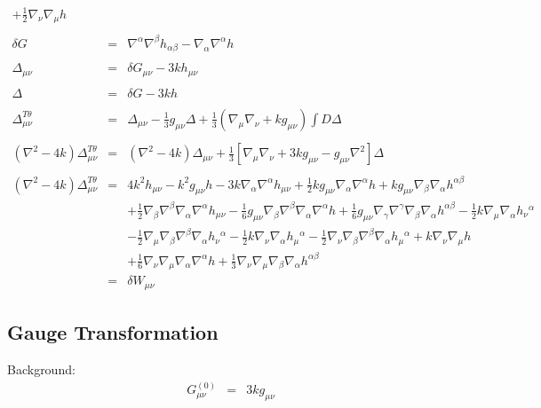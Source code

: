 \documentclass[10pt,letterpaper]{article}
\numberwithin{equation}{section}
\begin{document}
\begin{eqnarray}
+ \tfrac{1}{2} \nabla_{\nu}\nabla_{\mu}h
\nonumber\\ \nonumber\\
\delta G &=&  \nabla^\alpha \nabla^\beta h_{\alpha\beta} - \nabla_\alpha\nabla^\alpha h
\nonumber\\\nonumber\\
\Delta_{\mu\nu} &=& \delta G_{\mu\nu}-3k h_{\mu\nu}
\nonumber\\ \nonumber\\
\Delta &=& \delta G-3k h
\nonumber\\\nonumber\\
\Delta^{T\theta}_{\mu\nu} &=&  \Delta_{\mu\nu} - \frac{1}{3}g_{\mu\nu} \Delta + \frac{1}{3}\left( \nabla_\mu\nabla_\nu +kg_{\mu\nu}\right)\int D \Delta
\nonumber\\ \nonumber\\
(\nabla^2 -4k)\Delta^{T\theta}_{\mu\nu} &=& (\nabla^2 -4k)\Delta_{\mu\nu} +
\frac{1}{3}\left[ \nabla_\mu\nabla_\nu + 3k g_{\mu\nu} - g_{\mu\nu}\nabla^2\right] \Delta
\nonumber\\ \nonumber\\
(\nabla^2 -4k)\Delta^{T\theta}_{\mu\nu} &=& 
4 k^2 h_{\mu \nu}
-  k^2 g_{\mu \nu} h
- 3 k \nabla_{\alpha}\nabla^{\alpha}h_{\mu \nu}
+ \tfrac{1}{2} k g_{\mu \nu} \nabla_{\alpha}\nabla^{\alpha}h
+ k g_{\mu \nu} \nabla_{\beta}\nabla_{\alpha}h^{\alpha \beta}\nonumber\\
&& + \tfrac{1}{2} \nabla_{\beta}\nabla^{\beta}\nabla_{\alpha}\nabla^{\alpha}h_{\mu \nu}
-  \tfrac{1}{6} g_{\mu \nu} \nabla_{\beta}\nabla^{\beta}\nabla_{\alpha}\nabla^{\alpha}h
+ \tfrac{1}{6} g_{\mu \nu} \nabla_{\gamma}\nabla^{\gamma}\nabla_{\beta}\nabla_{\alpha}h^{\alpha \beta}
-  \tfrac{1}{2} k \nabla_{\mu}\nabla_{\alpha}h_{\nu}{}^{\alpha}\nonumber\\
&& -  \tfrac{1}{2} \nabla_{\mu}\nabla_{\beta}\nabla^{\beta}\nabla_{\alpha}h_{\nu}{}^{\alpha}
-  \tfrac{1}{2} k \nabla_{\nu}\nabla_{\alpha}h_{\mu}{}^{\alpha}
-  \tfrac{1}{2} \nabla_{\nu}\nabla_{\beta}\nabla^{\beta}\nabla_{\alpha}h_{\mu}{}^{\alpha}
+ k \nabla_{\nu}\nabla_{\mu}h\nonumber\\
&& + \tfrac{1}{6} \nabla_{\nu}\nabla_{\mu}\nabla_{\alpha}\nabla^{\alpha}h
+ \tfrac{1}{3} \nabla_{\nu}\nabla_{\mu}\nabla_{\beta}\nabla_{\alpha}h^{\alpha \beta}
\nonumber\\
&=& \delta W_{\mu\nu}
\end{eqnarray}
%
%
\subsection{Gauge Transformation}
Background:
\begin{eqnarray}
G^{(0)}_{\mu\nu} &=& 3kg_{\mu\nu}
\end{eqnarray}
\end{document}

